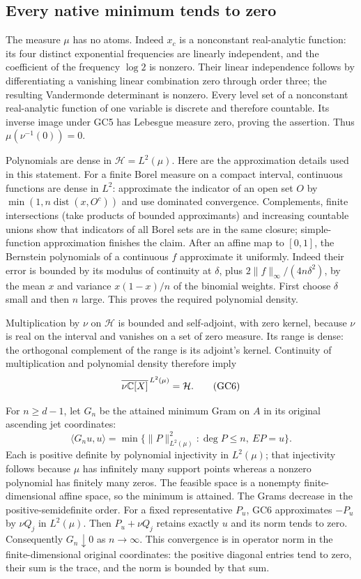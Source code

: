 \subsection{Every native minimum tends to zero}
The measure $\mu$ has no atoms. Indeed $x_c$ is a nonconstant
real-analytic function: its four distinct exponential frequencies
are linearly independent, and the coefficient of the frequency
$\log2$ is nonzero. Their linear independence follows by
differentiating a vanishing linear combination zero through
order three; the resulting Vandermonde determinant is nonzero.
Every level set of a nonconstant real-analytic function of one
variable is discrete and therefore countable. Its inverse
image under GC5 has Lebesgue measure zero, proving the assertion.
Thus $\mu(\nu^{-1}(0))=0$.

Polynomials are dense in $\mathcal H=L^2(\mu)$.
Here are the approximation details used in this statement.
For a finite Borel measure on a compact interval, continuous
functions are dense in $L^2$: approximate the indicator of an
open set $O$ by $\min(1,n\operatorname{dist}(x,O^c))$ and use
dominated convergence. Complements, finite intersections (take
products of bounded approximants) and increasing countable
unions show that indicators of all Borel sets are in the same
closure; simple-function approximation finishes the claim.
After an affine map to $[0,1]$, the Bernstein polynomials of a
continuous $f$ approximate it uniformly. Indeed their error is
bounded by its modulus of continuity at $\delta$, plus
$2\|f\|_\infty/(4n\delta^2)$, by the mean $x$ and variance
$x(1-x)/n$ of the binomial weights. First choose $\delta$ small
and then $n$ large. This proves the required polynomial density.

Multiplication by $\nu$ on $\mathcal H$ is bounded and
self-adjoint, with zero kernel, because $\nu$ is real on the
interval and vanishes on a set of zero measure. Its range is
dense: the orthogonal complement of the range is its adjoint's
kernel. Continuity of multiplication and polynomial density
therefore imply
\[
 \overline{\nu\mathbb C[X]}^{\,L^2(\mu)}=\mathcal H.
 \tag{GC6}\label{gc:relation-closure}
\]

For $n\ge d-1$, let $G_n$ be the attained minimum Gram on $A$
in its original ascending jet coordinates:
\[
 \langle G_nu,u\rangle
 =\min\{\|P\|_{L^2(\mu)}^2:\deg P\le n,\ EP=u\}.
 \tag{GC7}\label{gc:minimum}
\]
Each is positive definite by polynomial injectivity in $L^2(\mu)$;
that injectivity follows because $\mu$ has infinitely many
support points whereas a nonzero polynomial has finitely many
zeros. The feasible space is a nonempty finite-dimensional affine
space, so the minimum is attained. The Grams decrease in the
positive-semidefinite order. For a fixed representative $P_u$,
GC6 approximates $-P_u$ by $\nu Q_j$ in $L^2(\mu)$.
Then $P_u+\nu Q_j$ retains exactly $u$ and its norm tends to zero.
Consequently $G_n\downarrow0$ as $n\to\infty$.
This convergence is in operator norm in the finite-dimensional
original coordinates: the positive diagonal entries tend to
zero, their sum is the trace, and the norm is bounded by that sum.

